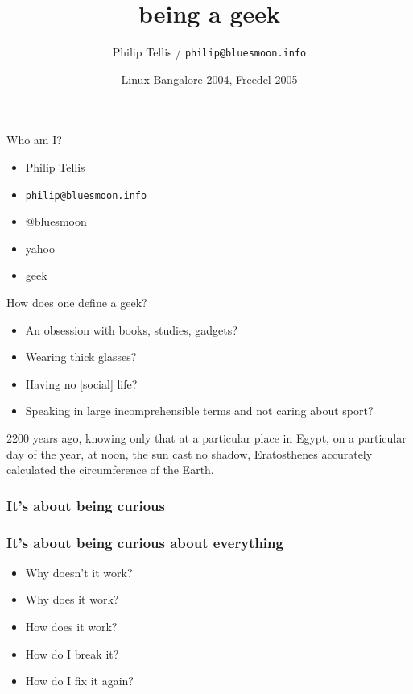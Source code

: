\documentclass{beamer}
\title{being a geek}
\author{Philip Tellis / \texttt{philip@bluesmoon.info}}
\institute{Yahoo!}
\date{Linux Bangalore 2004, Freedel 2005}
\begin{document}
\begin{frame}
  \titlepage
\end{frame}


\begin{frame}{Who am I?}
  \begin{itemize}
  \item Philip Tellis
  \item \small{\texttt{philip@bluesmoon.info}}
  \item @bluesmoon
  \item yahoo
  \item geek
  \end{itemize}
\end{frame}


\begin{frame}{How does one define a geek?}
  \begin{itemize}
  \item An obsession with books, studies, gadgets?
  \item Wearing thick glasses?
  \item Having no [social] life?
  \item Speaking in large incomprehensible terms and not caring about sport?
  \end{itemize}
\end{frame}

\begin{frame}{}
  \begin{block}{}
  \begin{center}
2200 years ago, knowing only that at a particular place in Egypt, on a 
particular day of the year, at noon, the sun cast no shadow, Eratosthenes
accurately calculated the circumference of the Earth.
  \end{center}
  \end{block}
\end{frame}

\begin{frame}
\frametitle<1>{It's about being curious}
\frametitle<2->{It's about being curious about everything}
  \begin{itemize}
  \item Why doesn't it work?
  \item<2-> Why does it work?
  \item<2-> How does it work?
  \item<2-> How do I break it?
  \item<2-> How do I fix it again?
  \end{itemize}
\end{frame}
\end{document}
